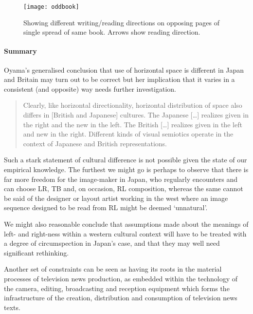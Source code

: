 \documentclass[11pt, oneside, a4paper]{scrartcl}
\begin{document}
\begin{figure}[tb]
\begin{center}
\texttt{[image: oddbook]}
\caption[Variations in reading direction in single text]{Showing different writing/reading directions on opposing pages of single spread of same book. Arrows show reading direction. \citep[76-77]{Hara:2001NJ}\label{fig:oddbook}}
\end{center}
\end{figure}

\paragraph*{Summary}

Oyama's generalised conclusion that use of horizontal space is different in Japan and Britain may turn out to be correct but her implication that it varies in a consistent (and opposite) way needs further investigation.

\begin{quote}
Clearly, like horizontal directionality, horizontal distribution of space also differs in [British and Japanese] cultures. The Japanese [{\ldots}] realizes given in the right and the new in the left. The British [{\ldots}] realizes given in the left and new in the right. Different kinds of visual semiotics operate in the context of Japanese and British representations.\\ \citep[154]{Oyama:2001}
\end{quote}

Such a stark statement of cultural difference is not possible given the state of our empirical knowledge. The furthest we might go is perhaps to observe that there is far more freedom for the image-maker in Japan, who regularly encounters and can choose LR, TB and, on occasion, RL composition, whereas the same cannot be said of the designer or layout artist working in the west where an image sequence designed to be read from RL might be deemed `unnatural'.

We might also reasonable conclude that assumptions made about the meanings of left- and right-ness within a western cultural context will have to be treated with a degree of circumspection in Japan's case, and that they may well need significant rethinking. 

\bigskip

Another set of constraints can be seen as having its roots in the material processes of television news production, as embedded within the technology of the camera, editing, broadcasting and reception equipment which forms the infrastructure of the creation, distribution and consumption of television news texts.
\end{document}
